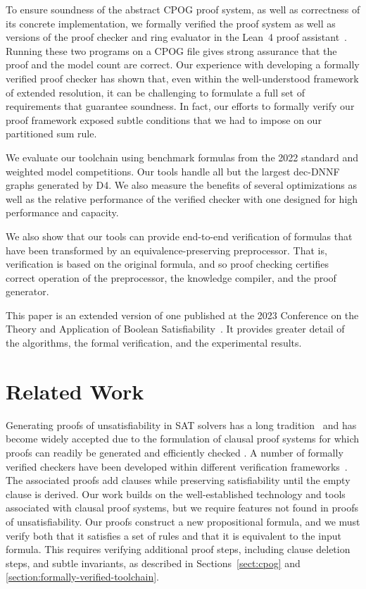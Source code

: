 \documentclass[twoside,11pt]{article}
\newcommand{\progname}[1]{\textsc{#1}}
\newcommand{\dfour}{\progname{D4}}
\newcommand{\lean}{Lean~4}
\begin{document}
To ensure soundness of the abstract CPOG proof system, as well as
correctness of its concrete implementation, we formally verified the
proof system as well as versions of the proof checker and ring
evaluator in the \lean{} proof assistant~\cite{demoura:cade:2021}.
Running these two programs on a  CPOG file gives strong
assurance that the proof and the model count are correct. Our
experience with developing a formally verified proof checker has shown
that, even within the well-understood framework of extended
resolution, it can be challenging to formulate a full set of
requirements that guarantee soundness.  In fact, our efforts to
formally verify our proof framework exposed subtle conditions that we had
to impose on our partitioned sum rule.


We evaluate our toolchain using benchmark formulas from the 2022
standard and weighted model competitions.  Our tools handle all but
the largest dec-DNNF graphs generated by \dfour{}.  We also measure
the benefits of several optimizations as well as the relative
performance of the verified checker with one designed for high
performance and capacity.

We also show that our tools can provide end-to-end verification of
formulas that have been transformed by an equivalence-preserving
preprocessor.  That is, verification is based on the original formula,
and so proof checking certifies correct operation of the preprocessor,
the knowledge compiler, and the proof generator.

This paper is an extended version of one published at the 2023
Conference on the Theory and Application of Boolean
Satisfiability~\cite{bryant:sat:2023}.  It provides greater detail of
the algorithms, the formal verification, and the experimental results.

\section{Related Work}


Generating proofs of unsatisfiability in SAT solvers has a long
tradition~\cite{ZhangMalik} and has become widely accepted due to the
formulation of clausal proof systems for which proofs can readily be
generated and efficiently checked
\cite{heule:cade:2013,wetzler14_drattrim}.
A number of formally verified checkers have been developed within different verification frameworks~\cite{cruz-cade-2017,lrat,Lammich:20,Tan:2021}.
The associated proofs add clauses while preserving satisfiability until the empty clause is derived.
Our work builds on the well-established technology and tools associated with clausal proof systems,
but we require features not found in proofs of unsatisfiability.
Our proofs construct a new propositional formula, and we must verify
both
that it
satisfies a set of rules and that it
is equivalent to the input formula.  This requires verifying
additional proof steps, including clause deletion steps, and subtle
invariants, as described in Sections~\ref{sect:cpog} and
\ref{section:formally-verified-toolchain}.
\end{document}
